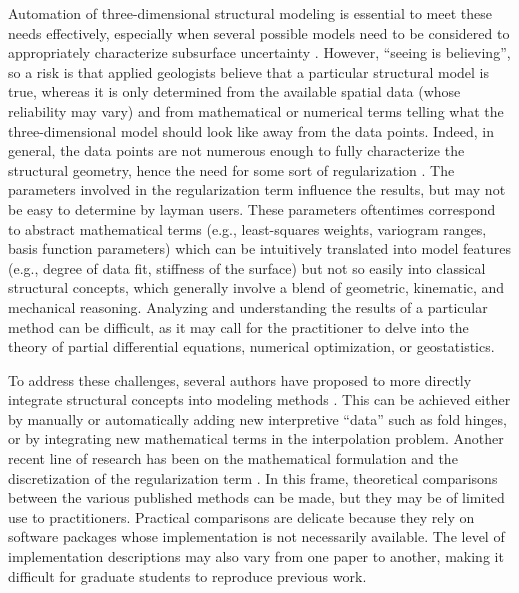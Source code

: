 \documentclass[preprint]{elsarticle}
\begin{document}
Automation of three-dimensional structural modeling is essential to meet these needs effectively, especially when several possible models need to be considered to appropriately characterize subsurface uncertainty \citep{Wellmann2018AiG}. However, ``seeing is believing'', so a risk is that applied geologists believe that a particular structural model is true, whereas it is only determined from the available spatial data (whose reliability may vary) and from mathematical or numerical terms telling what the three-dimensional model should look like away from the data points. Indeed, in general, the data points are not numerous enough to fully characterize the structural geometry, hence the need for some sort of regularization \citep[e.g.,][]{Renaudeau2019MG}. The parameters involved in the regularization term influence the results, but may not be easy to determine by layman users. These parameters oftentimes correspond to abstract mathematical terms (e.g., least-squares weights, variogram ranges, basis function parameters) which can be intuitively translated into model features (e.g., degree of data fit, stiffness of the surface) but not so easily into classical structural concepts, which generally involve a blend of geometric, kinematic, and mechanical reasoning. Analyzing and understanding the results of a particular method can be difficult, as it may call for the practitioner to delve into the theory of partial differential equations, numerical optimization, or geostatistics. 

To address these challenges, several authors have proposed to more directly integrate structural concepts into modeling methods \citep{Maxelon2009C&G,MassiotGM2010,Laurent2016EaPSL,Grose2017JSG,Grose2018JGRSE,Grose2019JoSG}. This can be achieved either by manually or automatically adding new interpretive ``data'' such as fold hinges, or by integrating new mathematical terms in the interpolation problem. Another recent line of research has been on the mathematical formulation and the discretization of the regularization term \citep{Laurent2016MG,Martin2017CG,Irakarama2018EAGE,Renaudeau2019MG}. In this frame, theoretical comparisons between the various published methods can be made, but they may be of limited use to practitioners. Practical comparisons are delicate because they rely on software packages whose implementation is not necessarily available. The level of implementation descriptions may also vary from one paper to another, making it difficult for graduate students to reproduce previous work. 
\end{document}
